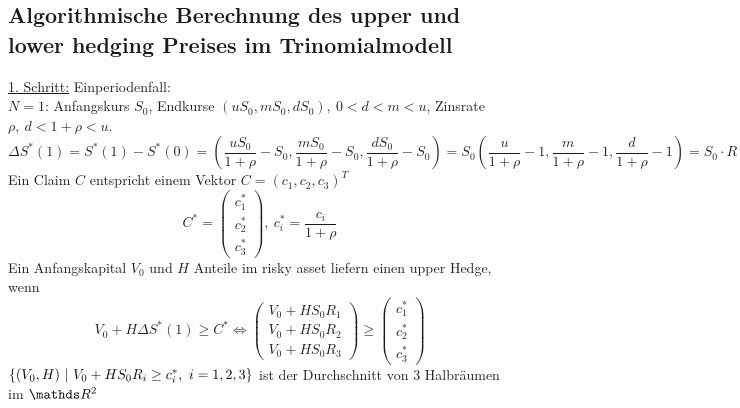 \subsection{Algorithmische Berechnung des upper und lower hedging Preises im Trinomialmodell}
\label{sub:alg_berechnung}
\uline{1. Schritt:} Einperiodenfall:\\
$N=1$: Anfangskurs $S_0$, Endkurse $(uS_0,mS_0,dS_0),~0<d<m<u$, Zinsrate $\rho,~d<1+\rho<u$.
\[
\Delta S^*(1)=S^*(1)-S^*(0)=(\frac{uS_0}{1+\rho}-S_0,\frac{mS_0}{1+\rho}-S_0,\frac{dS_0}{1+\rho}-S_0)=S_0(\frac{u}{1+\rho}-1,\frac{m}{1+\rho}-1,\frac{d}{1+\rho}-1)=S_0\cdot R
\]
Ein Claim $C$ entspricht einem Vektor $C=(c_1,c_2,c_3)^T$
\[
C^*=\left(\begin{array}{c}c_1^*\\c_2^*\\c_3^* \end{array}\right),~c_i^*=\frac{c_i}{1+\rho}
\]
Ein Anfangskapital $V_0$ und $H$ Anteile im risky asset liefern einen upper Hedge, wenn 
\[
V_0+H\Delta S^*(1)\ge C^*\Leftrightarrow \left(\begin{array}{c}V_0+HS_0R_1\\V_0+HS_0R_2\\V_0+HS_0R_3 \end{array}\right)\ge \left(\begin{array}{c}c_1^*\\c_2^*\\c_3^*     \end{array}\right)
\]
$\left\{(V_0,H)~|~V_0+HS_0R_i\ge c_i^*,~i=1,2,3\right\}$ ist der Durchschnitt von 3 Halbräumen im $\R^2$
